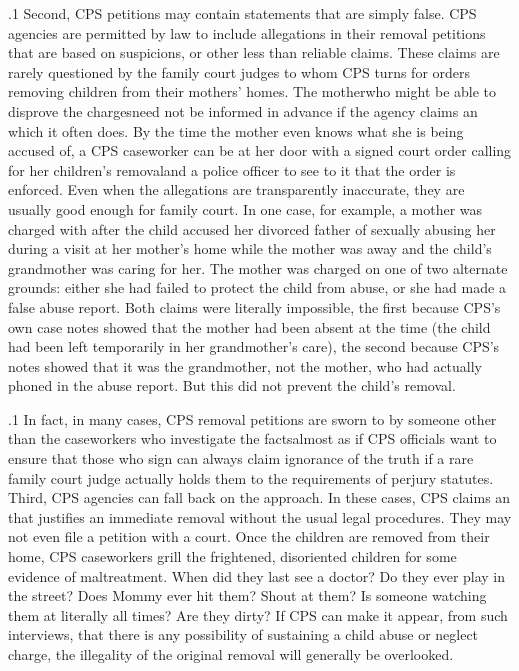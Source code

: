 \documentclass[11pt, twoside]{article}
\begin{document}
{\p.1{%
Second, CPS petitions may contain statements that are simply false.
CPS agencies are permitted by law to include allegations in their removal
petitions that are based on suspicions,  or other less than reliable
claims. These claims are rarely questioned by the family court judges
to whom CPS turns for orders removing children from their mothers'
homes. The mother\mdash{}who might be able to disprove the charges\mdash{}need
not be informed in advance if the agency claims an  which
it often does. By the time the mother even knows what she is being accused of, a CPS caseworker can be at her door with a signed court order
calling for her children's removal\mdash{}and a police officer to see to it that the order is enforced. Even when the allegations are transparently inaccurate,
they are usually good enough for family court. In one case, for example,
a mother was charged with  after the child accused her divorced father of sexually abusing her during a visit at her mother's home
while the mother was away and the child's grandmother was caring for
her. The mother was charged on one of two alternate grounds: either she
had failed to protect the child from abuse, or she had made a false abuse
report. Both claims were literally impossible, the first because CPS's own
case notes showed that the mother had been absent at the time (the child
had been left temporarily in her grandmother's care), the second because
CPS's notes showed that it was the grandmother, not the mother, who
had actually phoned in the abuse report. But this did not prevent the
child's removal.
}%

\p.1{%
In fact, in many cases, CPS removal petitions are sworn to by someone other than the caseworkers who investigate the facts\mdash{}almost as if
CPS officials want to ensure that those who sign can always claim ignorance of the truth if a rare family court judge actually holds them to the
requirements of perjury statutes.
Third, CPS agencies can fall back on the  approach. In these cases, CPS claims an  that justifies
an immediate removal without the usual legal procedures. They may not
even file a petition with a court. Once the children are removed from
their home, CPS caseworkers grill the frightened, disoriented children
for some evidence of maltreatment. When did they last see a doctor? Do
they ever play in the street? Does Mommy ever hit them? Shout at them?
Is someone watching them at literally all times? Are they dirty? If CPS
can make it appear, from such interviews, that there is any possibility of
sustaining a child abuse or neglect charge, the illegality of the original
removal will generally be overlooked.
}%


}
\end{document}
